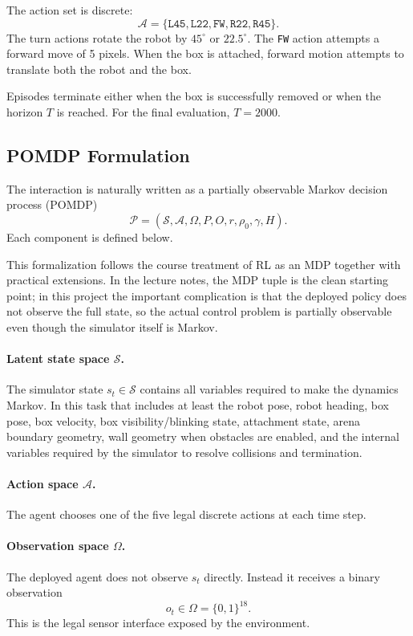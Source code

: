 \documentclass[11pt, oneside]{article}   	%
\begin{document}
The action set is discrete:
\[
  \mathcal{A} = \{\texttt{L45},\texttt{L22},\texttt{FW},\texttt{R22},\texttt{R45}\}.
\]
The turn actions rotate the robot by \(45^\circ\) or \(22.5^\circ\). The \texttt{FW} action
attempts a forward move of 5 pixels. When the box is attached, forward motion attempts
to translate both the robot and the box.

Episodes terminate either when the box is successfully removed or when the horizon
\(T\) is reached. For the final evaluation, \(T=2000\).

\subsection{POMDP Formulation}

The interaction is naturally written as a partially observable Markov decision process
(POMDP)
\[
  \mathcal{P}=(\mathcal{S},\mathcal{A},\Omega,P,O,r,\rho_0,\gamma,H).
\]
Each component is defined below.

This formalization follows the course treatment of RL as an MDP together with practical
extensions. In the lecture notes, the MDP tuple is the clean starting point; in this
project the important complication is that the deployed policy does not observe the full
state, so the actual control problem is partially observable even though the simulator
itself is Markov.

\paragraph{Latent state space \(\mathcal{S}\).}
The simulator state
\(s_t\in\mathcal{S}\) contains all variables required to make the dynamics Markov. In
this task that includes at least the robot pose, robot heading, box pose, box velocity,
box visibility/blinking state, attachment state, arena boundary geometry, wall geometry
when obstacles are enabled, and the internal variables required by the simulator to
resolve collisions and termination.

\paragraph{Action space \(\mathcal{A}\).}
The agent chooses one of the five legal discrete actions at each time step.

\paragraph{Observation space \(\Omega\).}
The deployed agent does not observe \(s_t\) directly. Instead it receives a binary
observation
\[
  o_t\in\Omega=\{0,1\}^{18}.
\]
This is the legal sensor interface exposed by the environment.
\end{document}
